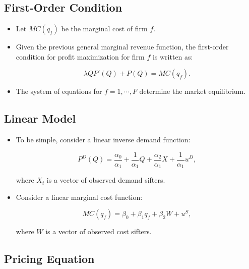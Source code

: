 \documentclass[]{book}
\providecommand{\tightlist}{%
  \setlength{\itemsep}{0pt}\setlength{\parskip}{0pt}}
\begin{document}
\subsection{First-Order Condition}\label{first-order-condition}

\begin{itemize}
\tightlist
\item
  Let \(MC(q_f)\) be the marginal cost of firm \(f\).
\item
  Given the previous general marginal revenue function, the first-order
  condition for profit maximization for firm \(f\) is written as:

  \begin{equation}
  \lambda Q P'(Q) + P(Q) = MC(q_f).
  \end{equation}
\item
  The system of equations for \(f = 1, \cdots, F\) determine the market
  equilibrium.
\end{itemize}

\subsection{Linear Model}\label{linear-model}

\begin{itemize}
\tightlist
\item
  To be simple, consider a linear inverse demand function:

  \begin{equation}
  P^D(Q) = \frac{\alpha_0}{\alpha_1} + \frac{1}{\alpha_1}Q + \frac{\alpha_2}{\alpha_1} X + \frac{1}{\alpha_1}u^D,
  \end{equation}

  where \(X_t\) is a vector of observed demand sifters.
\item
  Consider a linear marginal cost function:

  \begin{equation}
  MC(q_{f}) = \beta_0 + \beta_1 q_{f} + \beta_2 W + u^S,
  \end{equation}

  where \(W\) is a vector of observed cost sifters.
\end{itemize}

\subsection{Pricing Equation}\label{pricing-equation}
\end{document}
